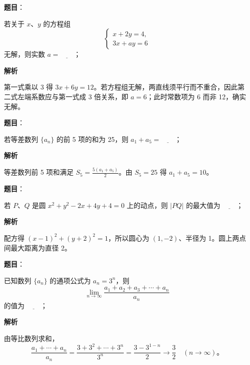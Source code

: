 \begin{answer}

\textbf{题目}：

若关于 $x\text{、}y$ 的方程组
\nopagebreak[4]
\[
\begin{cases}
x+2y=4,\\
3x+ay=6
\end{cases}
\]
无解，则实数 $a=\underline{\qquad}$；

\textbf{解析}

第一式乘以 3 得 $3x+6y=12$。若方程组无解，两直线须平行而不重合，因此第二式左端系数应与第一式成 3 倍关系，即 $a=6$；此时常数项为 6 而非 12，确实无解。


\end{answer}
\begin{answer}

\textbf{题目}：

若等差数列 $\{a_n\}$ 的前 5 项的和为 25，则 $a_1+a_5=\underline{\qquad}$；

\textbf{解析}

等差数列前 5 项和满足 $S_5=\frac{5(a_1+a_5)}2$。由 $S_5=25$ 得 $a_1+a_5=10$。


\end{answer}
\begin{answer}

\textbf{题目}：

若 $P\text{、}Q$ 是圆 $x^2+y^2-2x+4y+4=0$ 上的动点，则 $|PQ|$ 的最大值为 $\underline{\qquad}$；

\textbf{解析}

配方得 $(x-1)^2+(y+2)^2=1$，所以圆心为 $(1,-2)$、半径为 1。圆上两点间最大距离为直径 2。


\end{answer}
\begin{answer}

\textbf{题目}：

已知数列 $\{a_n\}$ 的通项公式为 $a_n=3^n$，则
\nopagebreak[4]
\[
\lim_{n\to\infty}\frac{a_1+a_2+a_3+\cdots+a_n}{a_n}
\]
的值为 $\underline{\qquad}$；

\textbf{解析}

由等比数列求和，
\nopagebreak[4]
\[
\frac{a_1+\cdots+a_n}{a_n}
=\frac{3+3^2+\cdots+3^n}{3^n}
=\frac{3-3^{1-n}}2\longrightarrow\frac32\quad(n\to\infty)\mbox{。}
\]


\end{answer}
